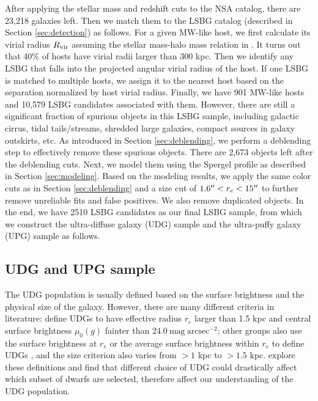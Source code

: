 \documentclass[twocolumn,astrosymb,twocolappendix]{aastex631}
\newcommand{\sbunit}{\mathrm{mag\ arcsec}^{-2}}
\begin{document}
\begin{CJK*}{UTF8}{gbsn}
After applying the stellar mass and redshift cuts to the NSA catalog, there are 23,218 galaxies left. Then we match them to the LSBG catalog (described in Section \ref{sec:detection}) as follows. For a given MW-like host, we first calculate its virial radius $R_{\rm vir}$ assuming the stellar mass-halo mass relation in \citet{Behroozi2010}. It turns out that 40\% of hosts have virial radii larger than 300 kpc. Then we identify any LSBG that falls into the projected angular virial radius of the host. If one LSBG is matched to multiple hosts, we assign it to the nearest host based on the separation normalized by host virial radius. Finally, we have 901 MW-like hosts and 10,579 LSBG candidates associated with them. However, there are still a significant fraction of spurious objects in this LSBG sample, including galactic cirrus, tidal tails/streams, shredded large galaxies, compact sources in galaxy outskirts, etc. As introduced in Section \ref{sec:deblending}, we perform a deblending step to effectively remove these spurious objects. There are 2,673 objects left after the deblending cuts. Next, we model them using the Spergel profile as described in Section \ref{sec:modeling}. Based on the modeling results, we apply the same color cuts as in Section \ref{sec:deblending} and a size cut of $1.6\mbox{$^{\prime\prime}$} < r_e < 15\mbox{$^{\prime\prime}$}$ to further remove unreliable fits and false positives. We also remove duplicated objects. In the end, we have 2510 LSBG candidates as our final LSBG sample, from which we construct the ultra-diffuse galaxy (UDG) sample and the ultra-puffy galaxy (UPG) sample as follows. 

\subsection{UDG and UPG sample}\label{sec:sample}
The UDG population is usually defined based on the surface brightness and the physical size of the galaxy. However, there are many different criteria in literature: \citep{vanDokkum2015} define UDGs to have effective radius $r_e$ larger than 1.5 kpc and central surface brightness $\mu_0(g)$ fainter than $24.0\ \sbunit$; other groups also use the surface brightness at $r_e$ \citep[e.g.,][]{DiCintio2017,Cardona-Barrero2020} or the average surface brightness within $r_e$ to define UDGs \citep[e.g.,][]{Koda2015,Yagi2016,vdBurg2016,Leisman2017,Martin2019}, and the size criterion also varies from $>1$ kpc to $>1.5$ kpc. \citet{vanNest2022} explore these definitions and find that different choice of UDG could drastically affect which subset of dwarfs are selected, therefore affect our understanding of the UDG population.


\end{CJK*}
\end{document}
